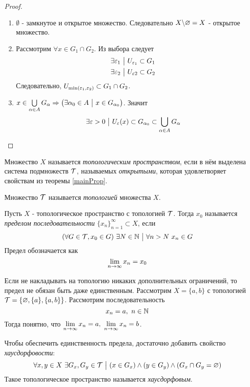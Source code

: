 \begin{proof}~
	\begin{enumerate}
		\item $\emptyset$ - замкнутое и открытое множество. Следовательно $X \backslash \varnothing = X$ - открытое множество.
		
		\item Рассмотрим $\forall x \in G_1 \cap G_2$. Из выбора следует
		\begin{align*}
			&\exists \varepsilon_1 \ \big|\  U_{\varepsilon_1} \subset G_1
			\\
			&\exists \varepsilon_2 \ \big|\  U_{\varepsilon 2} \subset G_2 
		\end{align*}
		Следовательно, $U_{\min(\varepsilon_1, \varepsilon_2)} \subset G_1 \cap G_2$.
		
		\item $x \in \bigcup\limits_{\alpha \in A} G_\alpha \Rightarrow \left(\exists \alpha_0 \in A \ \big|\  x \in G_{\alpha_0}\right)$. Значит
		\[
			\exists \varepsilon > 0 \ \big|\  U_\varepsilon(x) \subset G_{\alpha_0} \subset \bigcup\limits_{\alpha \in A} G_{\alpha}
		\]
	\end{enumerate}
\end{proof}

\begin{definition}
	Множество $X$ называется \textit{топологическим пространством}, если в нём выделена система подмножеств $\mathcal{T}$, называемых \textit{открытыми}, которая удовлетворяет свойствам из теоремы \ref{mainProp}.
	
	Множество $\mathcal{T}$ называется \textit{топологией} множества $X$.
\end{definition}

\begin{definition}
	Пусть $X$ - топологическое пространство с топологией $\mathcal{T}$. Тогда $x_0$ называется \textit{пределом последовательности} $\{x_n\}_{n = 1}^\infty \subset X$, если
	\[
		(\forall G \in \Tau, x_0 \in G)\ \exists N \in \N \such \forall n > N\ x_n \in G
	\]
	Предел обозначается как
	\[
		\lim\limits_{n \to \infty} x_n = x_0
	\]
\end{definition}

\begin{example}
	Если не накладывать на топологию никаких дополнительных ограничений, то предел не обязан быть даже единственным. Рассмотрим $X = \{a, b\}$ с топологией $\mathcal{T} = \{\varnothing, \{a\}, \{a, b\}\}$. Рассмотрим последовательность
	\[
		x_n = a,\ n \in \mathbb{N}
	\]
	Тогда понятно, что $\lim\limits_{n \to \infty} x_n = a,\ \lim\limits_{n \to \infty} x_n = b$.
\end{example}

\begin{anote}
	Чтобы обеспечить единственность предела, достаточно добавить свойство \textit{хаусдорфовости}:
	\[
		\forall x, y \in X\ \exists G_x, G_y \in \mathcal{T} \ \big|\  (x \in G_x) \wedge (y \in G_y) \wedge (G_x \cap G_y = \varnothing)
	\]
	Такое топологическое пространство называется \textit{хаусдорфовым}.
\end{anote}
